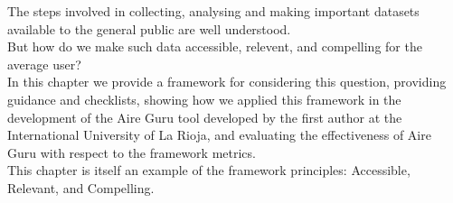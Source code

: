 The steps involved in collecting, analysing and making important datasets available to the general public are well understood. \\

But how do we make such data accessible, relevent, and compelling for the average user? \\

In this chapter we provide a framework for considering this question, providing guidance and checklists, showing how we applied this framework
in the development of the Aire Guru tool developed by the first author at the International University of La Rioja, and evaluating the effectiveness
of Aire Guru with respect to the framework metrics. \\

This chapter is itself an example of the framework principles: Accessible, Relevant, and Compelling. \\